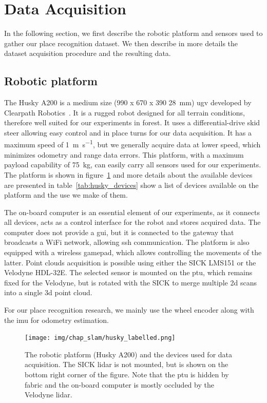 \section{Data Acquisition}
\label{sec:chap_slam_data_acquisition}

In the following section, we first describe the robotic platform and sensors used to gather our place recognition dataset. We then describe in more details the dataset acquisition procedure and the resulting data.


\subsection{Robotic platform}
\label{ssec:chap_slam_platform}

The Husky A200 is a medium size (990 x 670 x 390 \SI{28}{\milli\meter}) \gls{ugv} developed by Clearpath Robotics~\cite{ClearpathWeb}. It is a rugged robot designed for all terrain conditions, therefore well suited for our experiments in forest. It uses a differential-drive skid steer allowing easy control and in place turns for our data acquisition. It has a maximum speed of \SI{1}{\meter\per\second}, but we generally acquire data at lower speed, which minimizes odometry and range data errors. This platform, with a maximum payload capability of \SI{75}{\kilo\gram}, can easily carry all sensors used for our experiments. The platform is shown in figure~\ref{fig:chap_slam_husky} and more details about the available devices are presented in table~\ref{tab:husky_devices} show a list of devices available on the platform and the use we make of them.

The on-board computer is an essential element of our experiments, as it connects all devices, acts as a control interface for the robot and stores acquired data. The computer does not provide a \gls{gui}, but it is connected to the gateway that broadcasts a WiFi network, allowing \gls{ssh} communication. The platform is also equipped with a wireless gamepad, which allows controlling the movements of the latter. Point clouds acquisition is possible using either the SICK LMS151 or the Velodyne HDL-32E. The selected sensor is mounted on the \gls{ptu}, which remains fixed for the Velodyne, but is rotated with the SICK to merge multiple \gls{2d} scans into a single \gls{3d} point cloud.

For our place recognition research, we mainly use the wheel encoder along with the \gls{imu} for odometry estimation. 

\begin{figure}
    \centering
    \texttt{[image: img/chap\_slam/husky\_labelled.png]}
    \caption{The robotic platform (Husky A200) and the devices used for data acquisition. The SICK \gls{lidar} is not mounted, but is shown on the bottom right corner of the figure. Note that the \gls{ptu} is hidden by fabric and the on-board computer is mostly occluded by the Velodyne \gls{lidar}.}
    \label{fig:chap_slam_husky}
\end{figure}

